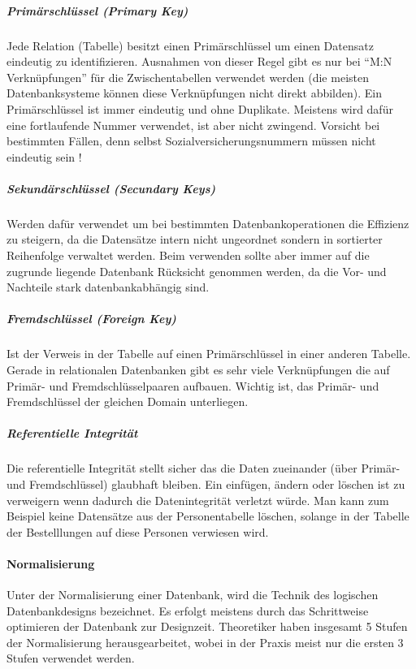 \subparagraph{Primärschlüssel (Primary Key)}\label{Primaerschluessel}
Jede Relation (Tabelle) besitzt einen Primärschlüssel um einen Datensatz eindeutig zu identifizieren. Ausnahmen von dieser Regel gibt es nur bei "`M:N Verknüpfungen"' für die Zwischentabellen verwendet werden (die meisten Datenbanksysteme können diese Verknüpfungen nicht direkt abbilden).
Ein Primärschlüssel ist immer eindeutig und ohne Duplikate. Meistens wird dafür eine fortlaufende Nummer verwendet, ist aber nicht zwingend. Vorsicht bei bestimmten Fällen, denn selbst Sozialversicherungsnummern müssen nicht eindeutig sein ! 

\subparagraph{Sekundärschlüssel (Secundary Keys)}
Werden dafür verwendet um bei bestimmten Datenbankoperationen die Effizienz zu steigern, da die Datensätze intern nicht ungeordnet sondern in sortierter Reihenfolge verwaltet werden.
Beim verwenden sollte aber immer auf die zugrunde liegende Datenbank Rücksicht genommen werden, da die Vor- und Nachteile stark datenbankabhängig sind.

\subparagraph{Fremdschlüssel (Foreign Key)}
Ist der Verweis in der Tabelle auf einen Primärschlüssel in einer anderen Tabelle. Gerade in relationalen Datenbanken gibt es sehr viele Verknüpfungen die auf Primär- und Fremdschlüsselpaaren aufbauen. Wichtig ist, das Primär- und Fremdschlüssel der gleichen Domain unterliegen.

\subparagraph{Referentielle Integrität}
Die referentielle Integrität stellt sicher das die Daten zueinander (über Primär- und Fremdschlüssel) glaubhaft bleiben. Ein einfügen, ändern oder löschen ist zu verweigern wenn dadurch die Datenintegrität verletzt würde.
Man kann zum Beispiel keine Datensätze aus der Personentabelle löschen, solange in der Tabelle der Bestelllungen auf diese Personen verwiesen wird.

\paragraph{Normalisierung}
Unter der Normalisierung einer Datenbank, wird die Technik des logischen Datenbankdesigns bezeichnet. Es erfolgt meistens durch das Schrittweise optimieren der Datenbank zur Designzeit. Theoretiker haben insgesamt 5 Stufen der Normalisierung herausgearbeitet, wobei in der Praxis meist nur die ersten 3 Stufen verwendet werden.

